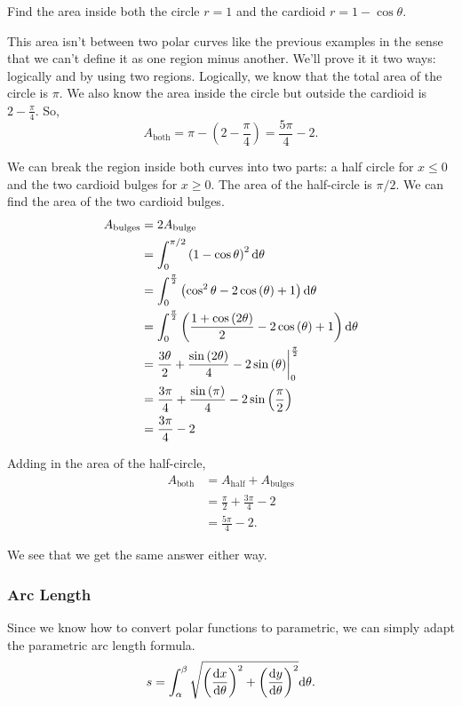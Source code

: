 \begin{example}
	Find the area inside both the circle $r=1$ and the cardioid $r=1-\cos{\theta}$.
\end{example}
\begin{answer}
	This area isn't between two polar curves like the previous examples in the sense that we can't define it as one region minus another.
	We'll prove it it two ways: logically and by using two regions.
	Logically, we know that the total area of the circle is $\pi$.
	We also know the area inside the circle but outside the cardioid is $2-\frac{\pi}{4}$.
	So,
	\begin{equation*}
		A_{\text{both}} = \pi - \left(2-\frac{\pi}{4}\right) = \frac{5\pi}{4} - 2.
	\end{equation*}
	
	We can break the region inside both curves into two parts: a half circle for $x\leq 0$ and the two cardioid bulges for $x\geq 0$.
	The area of the half-circle is $\pi/2$.
	We can find the area of the two cardioid bulges.
	\begin{align*}
		A_{\text{bulges}} &= 2A_{\text{bulge}} \\
		&= \int_{0}^{\pi/2}{\left(1-\cos{\theta}\right)^2\mathrm{d} \theta} \\
		&= \int_{0}^{\frac{\pi}{2}}\left(\cos^{2}\theta-2\cos\left(\theta\right)+1\right)\mathrm{d} \theta \\
		&= \int_{0}^{\frac{\pi}{2}}\left(\frac{1+\cos\left(2\theta\right)}{2}-2\cos\left(\theta\right)+1\right)\mathrm{d} \theta \\
		&= \frac{3\theta}{2}+\frac{\sin\left(2\theta\right)}{4}-2\sin\left(\theta\right)\biggr\rvert_{0}^{\frac{\pi}{2}} \\
		&= \frac{3\pi}{4}+\frac{\sin\left(\pi\right)}{4}-2\sin\left(\frac{\pi}{2}\right) \\
		&= \frac{3\pi}{4}-2 \\
	\end{align*}
	
	Adding in the area of the half-circle,
	\begin{align*}
		A_{\text{both}} &= A_{\text{half}} + A_{\text{bulges}} \\
		&= \frac{\pi}{2} + \frac{3\pi}{4} - 2 \\
		&= \frac{5\pi}{4} - 2.
	\end{align*}
	
	We see that we get the same answer either way.
\end{answer}

\subsubsection{Arc Length}
Since we know how to convert polar functions to parametric, we can simply adapt the parametric arc length formula.
\begin{equation*}
	s = \int_{\alpha}^{\beta}{\sqrt{\left(\frac{\mathrm{d} x}{\mathrm{d} \theta}\right)^2 + \left(\frac{\mathrm{d} y}{\mathrm{d} \theta}\right)^2}\mathrm{d} \theta}.
\end{equation*}


